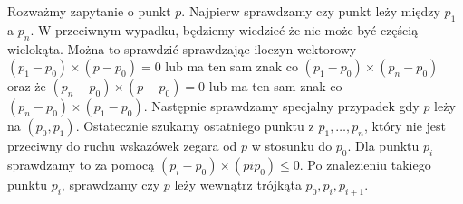 \documentclass[a4paper,11pt]{article}
\theoremstyle{mytheor}
\begin{document}
Rozważmy zapytanie o punkt $p$. Najpierw sprawdzamy czy punkt leży między $p_1$ a $p_n$. W przeciwnym wypadku, będziemy wiedzieć że nie może być częścią wielokąta. Można to sprawdzić sprawdzając iloczyn wektorowy $(p_1 - p_0) \times (p - p_0) = 0$ lub ma ten sam znak co $(p_1 - p_0) \times (p_n - p_0)$ oraz że $(p_n - p_0) \times (p - p_0) = 0$ lub ma ten sam znak co $(p_n - p_0) \times (p_1 - p_0)$. Następnie sprawdzamy specjalny przypadek gdy $p$ leży na $(p_0, p_1)$. Ostatecznie szukamy ostatniego punktu z $p_1,\ldots,p_n$, który nie jest przeciwny do ruchu wskazówek zegara od $p$ w stosunku do $p_0$. Dla punktu $p_i$ sprawdzamy to za pomocą $(p_i - p_0) \times (p i p_0) \leq 0$. Po znalezieniu takiego punktu $p_i$, sprawdzamy czy $p$ leży wewnątrz trójkąta $p_0, p_i, p_{i+1}$.
\end{document}

